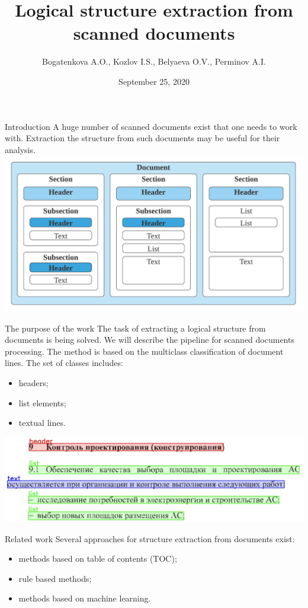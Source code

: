 \documentclass{beamer}
\title{Logical structure extraction from scanned documents}
\author{Bogatenkova A.O., Kozlov I.S., Belyaeva O.V., Perminov A.I.}
\date{September 25, 2020}
\begin{document}
\begin{frame}
\titlepage
\end{frame}

\begin{frame}{Introduction}
    A huge number of scanned documents exist that one needs to work with. Extraction the structure from such documents may be useful for their analysis.
    \hspace{0.5cm}
    \includegraphics[width=\textwidth]{pics/structure.png}
\end{frame}

\begin{frame}{The purpose of the work}
    The task of extracting a logical structure from documents is being solved. We will describe the pipeline for scanned documents processing. The method is based on the multiclass classification of document lines. The set of classes includes:
    \begin{itemize}
        \item headers;
        \item list elements;
        \item textual lines.
    \end{itemize}
    \includegraphics[width=\textwidth]{pics/structure_example.png}
\end{frame}

\begin{frame}{Related work}
    Several approaches for structure extraction from documents exist:
    \begin{itemize}
        \item methods based on table of contents (TOC);
        \item rule based methods;
        \item methods based on machine learning.
    \end{itemize}
\end{frame}
\end{document}

